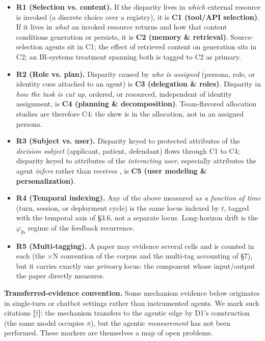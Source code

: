 \documentclass[acmsmall,nonacm]{acmart}
\begin{document}
\begin{itemize}
\item \textbf{R1 (Selection vs. content).} If the disparity lives in \emph{which} external resource is invoked (a discrete choice over a registry), it is \textbf{C1 (tool/API selection)}. If it lives in \emph{what} an invoked resource returns and how that content conditions generation or persists, it is \textbf{C2 (memory \& retrieval)}. Source-selection agents \cite{singh2025biasb} sit in C1; the effect of retrieved content on generation \cite{wu2024rag,hu2024free} sits in C2; an IR-systems treatment spanning both \cite{dai2024bias,dai2025trustworthy} is tagged to C2 as primary.
\item \textbf{R2 (Role vs. plan).} Disparity caused by \emph{who is assigned} (persona, role, or identity cues attached to an agent) is \textbf{C3 (delegation \& roles)}. Disparity in \emph{how the task is cut up}, ordered, or resourced, independent of identity assignment, is \textbf{C4 (planning \& decomposition)}. Team-flavored allocation studies \cite{parziale2026once} are therefore C4: the skew is in the allocation, not in an assigned persona.
\item \textbf{R3 (Subject vs. user).} Disparity keyed to protected attributes of the \emph{decision subject} (applicant, patient, defendant) flows through C1 to C4; disparity keyed to attributes of the \emph{interacting user}, especially attributes the agent \emph{infers} rather than receives \cite{staab2023memorization}, is \textbf{C5 (user modeling \& personalization)}.
\item \textbf{R4 (Temporal indexing).} Any of the above measured \emph{as a function of time} (turn, session, or deployment cycle) is the same locus indexed by $t$, tagged with the temporal axis of \S{}3.6, not a separate locus. Long-horizon drift is the $\varphi_{\mathrm{fb}}$ regime of the feedback recurrence.
\item \textbf{R5 (Multi-tagging).} A paper may evidence several cells and is counted in each (the $\times$N convention of the corpus and the multi-tag accounting of \S{}7), but it carries exactly one \emph{primary} locus: the component whose input/output the paper directly measures.
\end{itemize}

\textbf{Transferred-evidence convention.} Some mechanism evidence below originates in single-turn or chatbot settings rather than instrumented agents. We mark such citations \textbf{[$\dagger$]}: the mechanism transfers to the agentic edge by D1's construction (the same model occupies $\pi$), but the agentic \emph{measurement} has not been performed. These markers are themselves a map of open problems.
\end{document}
